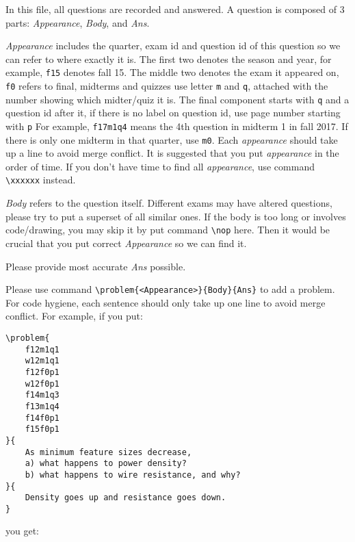 
In this file, all questions are recorded and answered.
A question is composed of 3 parts: \textit{Appearance}, \textit{Body}, and \textit{Ans}.

\textit{Appearance} includes the quarter, exam id and question id of this question so we can refer to where exactly it is.
The first two denotes the season and year, for example, \texttt{f15} denotes fall 15.
The middle two denotes the exam it appeared on, \texttt{f0} refers to final, midterms and quizzes use letter \texttt{m} and \texttt{q}, attached with the number showing which midter/quiz it is.
The final component starts with \texttt{q} and a question id after it, if there is no label on question id, use page number starting with \texttt{p}
For example, \texttt{f17m1q4} means the 4th question in midterm 1 in fall 2017. 
If there is only one midterm in that quarter, use \texttt{m0}.
Each \textit{appearance} should take up a line to avoid merge conflict. 
It is suggested that you put \textit{appearance} in the order of time.
If you don't have time to find all \textit{appearance}, use command \lstinline{\xxxxxx} instead.

\textit{Body} refers to the question itself. 
Different exams may have altered questions, please try to put a superset of all similar ones.
If the body is too long or involves code/drawing, you may skip it by put command \lstinline{\nop} here.
Then it would be crucial that you put correct \textit{Appearance} so we can find it.

Please provide most accurate \textit{Ans} possible.

Please use command \lstinline|\problem{<Appearance>}{Body}{Ans}| to add a problem.
For code hygiene, each sentence should only take up one line to avoid merge conflict.
For example, if you put:
\begin{lstlisting}
\problem{
    f12m1q1
    w12m1q1
    f12f0p1
    w12f0p1
    f14m1q3
    f13m1q4
    f14f0p1
    f15f0p1
}{
    As minimum feature sizes decrease, 
    a) what happens to power density?
    b) what happens to wire resistance, and why?
}{
    Density goes up and resistance goes down.
}
\end{lstlisting}
you get:


